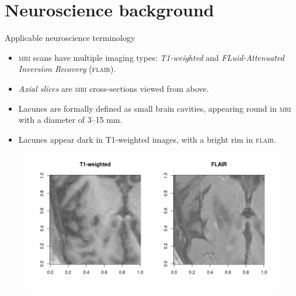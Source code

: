 \documentclass{beamer}
\begin{document}
\section{Neuroscience background}
\begin{frame}{Applicable neuroscience terminology}
	\begin{itemize}
	\item \textsc{mri} scans have multiple imaging types: \textit{T1-weighted} and \textit{FLuid-Attenuated Inversion Recovery} (\textsc{flair}).
	\item \textit{Axial slices} are \textsc{mri} cross-sections viewed from above.
	\item Lacunes are formally defined as small brain cavities, appearing round in \textsc{mri} with a diameter of 3--15 mm.
	\item Lacunes appear dark in T1-weighted images, with a bright rim in \textsc{flair}.
	\end{itemize}
	\begin{figure}
	\centering
	\includegraphics[width=0.8\linewidth]{../Thesis_Docs/Images/2_lacune_t1_flair.png}
	\end{figure}
	
\end{frame}
\end{document}
